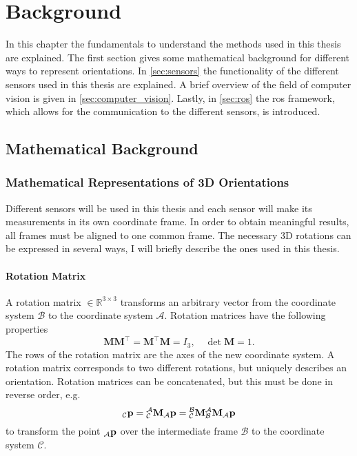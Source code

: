 \chapter{Background}
\label{ch:Background}
In this chapter the fundamentals to understand the methods used in this thesis are explained.
The first section gives some mathematical background for different ways to represent orientations.
In \cref{sec:sensors} the functionality of the different sensors used in this thesis are explained.
A brief overview of the field of computer vision is given in \cref{sec:computer_vision}.
Lastly, in \cref{sec:ros} the \gls{ros} framework, which allows for the communication to the different sensors, is introduced.


\section{Mathematical Background}
\subsection{Mathematical Representations of 3D Orientations}
Different sensors will be used in this thesis and each sensor will make its measurements in its own coordinate frame.
In order to obtain meaningful results, all frames must be aligned to one common frame.
The necessary 3D rotations can be expressed in several ways, I will briefly describe the ones used in this thesis.

\subsubsection{Rotation Matrix}
A rotation matrix  $\in \mathbb{R}^{3\times3}$ transforms an arbitrary vector from the coordinate system $\mathcal{B}$ to the coordinate system $\mathcal{A}$.
Rotation matrices have the following properties
\begin{equation}
	\mathbf{M}\mathbf{M}^\intercal = \mathbf{M}^\intercal \mathbf{M} = I_3, \quad \det \mathbf{M} = 1.
\end{equation}
The rows of the rotation matrix are the axes of the new coordinate system.
A rotation matrix corresponds to two different rotations, but uniquely describes an orientation.
Rotation matrices can be concatenated, but this must be done in reverse order, e.g.
\begin{equation}
	{}_\mathcal{C}\vb{p} = \mtf{a}{c}{}_\mathcal{A}\vb{p} = \mtf{b}{c}\mtf{a}{b}{}_\mathcal{A}\vb{p}
\end{equation}
to transform the point ${}_\mathcal{A}\vb{p}$ over the intermediate frame $\mathcal{B}$ to the coordinate system $\mathcal{C}$.

